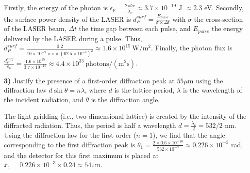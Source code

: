 \begin{breakbox}
    \noindent Firstly, the energy of the photon is $\displaystyle \epsilon_{\nu} = \frac{2\pi\hbar c}{\lambda_{\nu}}\approx 3.7 \times 10^{-19}$ J $\approx 2.3$ eV. Secondly, the surface power density of the LASER is $\displaystyle d^{surf}_{P}=\frac{E_{pulse}}{\sigma \times \Delta t}$ with $\sigma$ the cross-section of the LASER beam, $\Delta t$ the time gap between each pulse, and $E_{pulse}$ the energy delivered by the LASER during a pulse. Thus, $\displaystyle d^{surf}_{P}=\frac{0.2}{10 \times 10^{-9}\times \pi \times (62.5 \times 10^{-6})^2} \approx 1.6 \times 10^{15} \: \mathrm{W/m^2}$. Finally, the photon flux is $\displaystyle \frac{d^{surf}_{P}}{\epsilon_{\nu}} = \frac{1.6 \times 10^{15}}{3.7 \times 10^{-19}} \approx 4.4 \times 10^{33} \: \mathrm{photons / (m^2 s)}$.
\end{breakbox}

\medskip

\noindent \textbf{3)} Justify the presence of a first-order diffraction peak at $55 \mu \mathrm{m}$ using the diffraction law $d \sin \theta=n \lambda$, where $d$ is the lattice period, $\lambda$ is the wavelength of the incident radiation, and $\theta$ is the diffraction angle.\\

\begin{breakbox}
    \noindent The light gridding (i.e., two-dimensional lattice) is created by the intensity of the diffracted radiation. Thus, the period is half a wavelength $\displaystyle d = \frac{\lambda_{\nu}}{2} = 532/2$ nm. Using the diffraction law for the first order ($n = 1$), we find that the angle corresponding to the first diffraction peak is $\displaystyle \theta_1 = \frac{2 \times 0.6 \times 10^{-10}}{532 \times 10^{-9}} \approx 0.226 \times 10^{-3}$ rad, and the detector for this first maximum is placed at $x_1 = 0.226 \times 10^{-3} \times 0.24 \approx 54 \mathrm{\mu m}$.
\end{breakbox}


